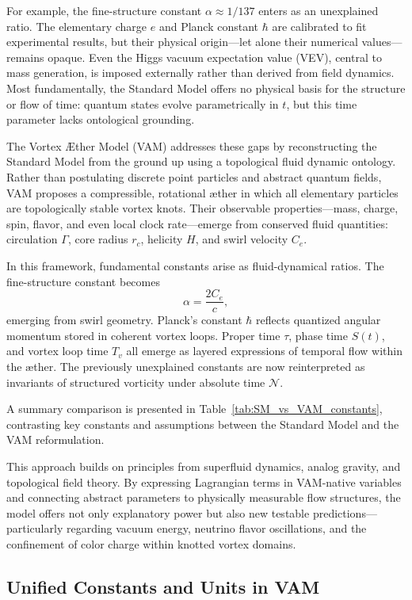 \documentclass[12pt]{article}
\begin{document}
For example, the fine-structure constant $\alpha \approx 1/137$ enters as an unexplained ratio. The elementary charge $e$ and Planck constant $\hbar$ are calibrated to fit experimental results, but their physical origin—let alone their numerical values—remains opaque. Even the Higgs vacuum expectation value (VEV), central to mass generation, is imposed externally rather than derived from field dynamics. Most fundamentally, the Standard Model offers no physical basis for the structure or flow of time: quantum states evolve parametrically in $t$, but this time parameter lacks ontological grounding.

The Vortex Æther Model (VAM) addresses these gaps by reconstructing the Standard Model from the ground up using a topological fluid dynamic ontology. Rather than postulating discrete point particles and abstract quantum fields, VAM proposes a compressible, rotational æther in which all elementary particles are topologically stable vortex knots. Their observable properties—mass, charge, spin, flavor, and even local clock rate—emerge from conserved fluid quantities: circulation $\Gamma$, core radius $r_c$, helicity $H$, and swirl velocity $C_e$.

In this framework, fundamental constants arise as fluid-dynamical ratios. The fine-structure constant becomes
\[
\alpha = \frac{2C_e}{c},
\]
emerging from swirl geometry. Planck’s constant $\hbar$ reflects quantized angular momentum stored in coherent vortex loops. Proper time $\tau$, phase time $S(t)$, and vortex loop time $T_v$ all emerge as layered expressions of temporal flow within the æther. The previously unexplained constants are now reinterpreted as invariants of structured vorticity under absolute time $\mathcal{N}$.

A summary comparison is presented in Table~\ref{tab:SM_vs_VAM_constants}, contrasting key constants and assumptions between the Standard Model and the VAM reformulation.

This approach builds on principles from superfluid dynamics, analog gravity, and topological field theory. By expressing Lagrangian terms in VAM-native variables and connecting abstract parameters to physically measurable flow structures, the model offers not only explanatory power but also new testable predictions—particularly regarding vacuum energy, neutrino flavor oscillations, and the confinement of color charge within knotted vortex domains.

\subsection*{Unified Constants and Units in VAM}
\end{document}
